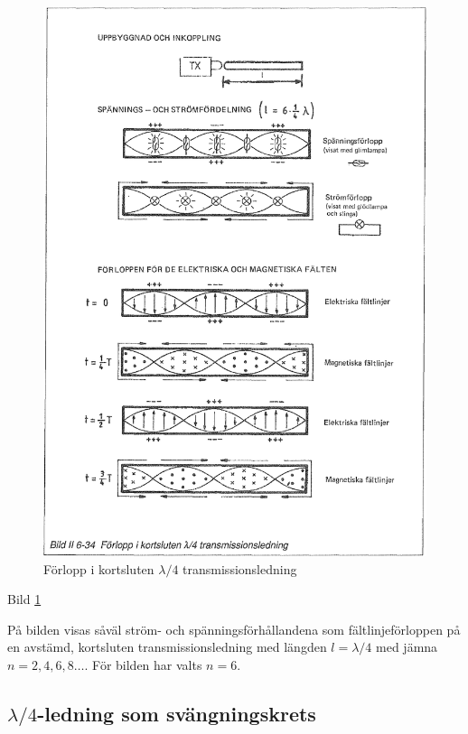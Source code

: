 \begin{figure}
  \includegraphics[width=\textwidth]{images/bild_2_6-34}
  \caption{Förlopp i kortsluten \(\lambda/4\) transmissionsledning}
  \label{fig:bildII6-34}
\end{figure}

Bild \ref{fig:bildII6-34}

På bilden visas såväl ström- och spänningsförhållandena som
fältlinjeförloppen på en avstämd, kortsluten transmissionsledning med
längden \(l = \lambda/4\) med jämna \(n = 2, 4, 6, 8 \dots\). För
bilden har valts \(n = 6\).

\subsection{\(\lambda/4\)-ledning som svängningskrets}

